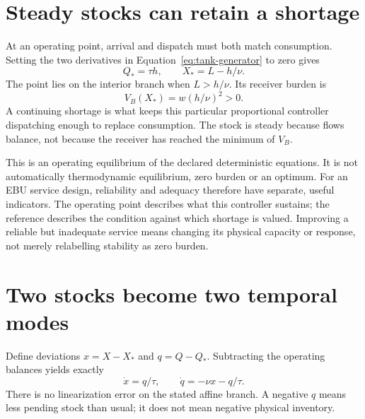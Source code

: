 \section{Steady stocks can retain a shortage}
At an operating point, arrival and dispatch must both match consumption. Setting the two derivatives in Equation~\ref{eq:tank-generator} to zero gives
\begin{equation}\label{eq:tank-operating}
 Q_*=\tau h,\qquad X_*=L-h/\nu.
\end{equation}
The point lies on the interior branch when $L>h/\nu$. Its receiver burden is
\begin{equation}
 V_B(X_*)=w(h/\nu)^2>0.
\end{equation}
A continuing shortage is what keeps this particular proportional controller dispatching enough to replace consumption. The stock is steady because flows balance, not because the receiver has reached the minimum of $V_B$.

This is an operating equilibrium of the declared deterministic equations. It is not automatically thermodynamic equilibrium, zero burden or an optimum. For an EBU service design, reliability and adequacy therefore have separate, useful indicators. The operating point describes what this controller sustains; the reference describes the condition against which shortage is valued. Improving a reliable but inadequate service means changing its physical capacity or response, not merely relabelling stability as zero burden.

\section{Two stocks become two temporal modes}
Define deviations $x=X-X_*$ and $q=Q-Q_*$. Subtracting the operating balances yields exactly
\begin{equation}\label{eq:tank-deviation}
 \dot x=q/\tau,\qquad \dot q=-\nu x-q/\tau.
\end{equation}
There is no linearization error on the stated affine branch. A negative $q$ means less pending stock than usual; it does not mean negative physical inventory.

